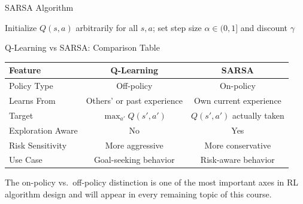 \begin{frame}{SARSA Algorithm}
    \begin{center}
    \footnotesize
    \begin{algorithm}[H]
        \DontPrintSemicolon
        \caption{SARSA (on-policy TD control)}
        Initialize $Q(s, a)$ arbitrarily for all $s, a$; set step size $\alpha \in (0, 1]$ and discount $\gamma$\;
    \end{algorithm}
    \end{center}
\end{frame}

\begin{frame}{Q-Learning vs SARSA: Comparison Table}
    \begin{table}[h!]
        \centering
        \renewcommand{\arraystretch}{1.8}
        \begin{tabular}{lcc}
            \hline
            \textbf{Feature} & \textbf{Q-Learning} & \textbf{SARSA} \\
            \hline
            Policy Type & Off-policy & On-policy \\
            Learns From & Others' or past experience & Own current experience \\
            Target & $\max_{a'} Q(s', a')$ & $Q(s', a')$ actually taken \\
            Exploration Aware & No & Yes \\
            Risk Sensitivity & More aggressive & More conservative \\
            Use Case & Goal-seeking behavior & Risk-aware behavior \\
            \hline
        \end{tabular}
    \end{table}
    \vspace{0.3em}
    \small The on-policy vs.\ off-policy distinction is one of the most important axes in RL algorithm design and will appear in every remaining topic of this course.
\end{frame}